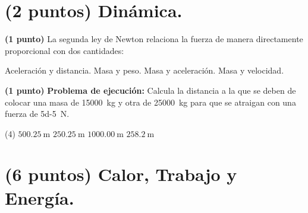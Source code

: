 \documentclass[12pt, letter]{exam}
\begin{document}


\newpage

\begin{questions}
    \section{(2 puntos) Dinámica.}

    \question \textbf{(1 punto)} La segunda ley de Newton relaciona la fuerza de manera directamente proporcional con dos cantidades:
    \begin{multicols}{2}
    \begin{tasks}
        \task Aceleración y distancia.
        \task Masa y peso.
        \task Masa y aceleración.
        \task Masa y velocidad.
    \end{tasks}
    \end{multicols}
    \question \textbf{(1 punto)} \label{Problema_01} \textbf{Problema de ejecución: } Calcula la distancia a la que se deben de colocar una masa de \SI{15000}{\kilo\gram} y otra de \SI{25000}{\kilo\gram} para que se atraigan con una fuerza de \SI{5d-5}{\newton}.
    \begin{tasks}(4)
        \task $\SI{500.25}{\meter}$
        \task $\SI{250.25}{\meter}$
        \task $\SI{1000.00}{\meter}$
        \task $\SI{258.2}{\meter}$
    \end{tasks}
    
    \section{(6 puntos) Calor, Trabajo y Energía.}
    

\end{questions}
\end{document}
